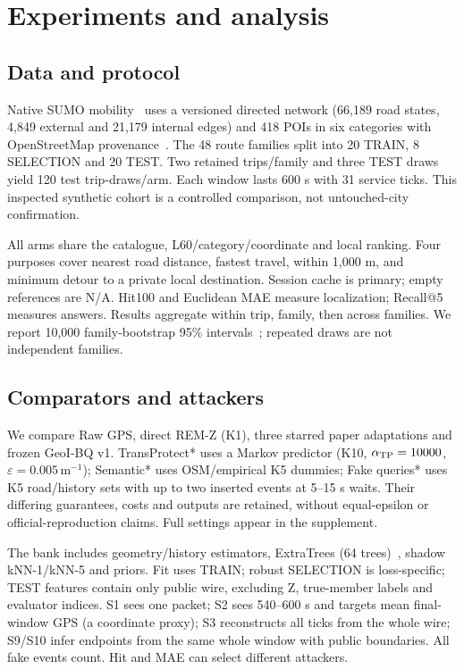 \section{Experiments and analysis}\label{sec:evaluation}
\subsection{Data and protocol}
Native SUMO mobility~\cite{sumo} uses a versioned directed network
(66,189 road states, 4,849 external and 21,179 internal edges) and
418 POIs in six categories with OpenStreetMap provenance~\cite{osm}.
The 48 route families split into 20 TRAIN, 8 SELECTION and 20 TEST.
Two retained trips/family and three TEST draws yield 120 test trip-draws/arm.
Each window lasts 600 s with 31 service ticks. This inspected synthetic cohort
is a controlled comparison, not untouched-city confirmation.

All arms share the catalogue, L60/category/coordinate and local ranking.
Four purposes cover nearest road distance, fastest travel, within 1,000 m,
and minimum detour to a private local destination.
Session cache is primary; empty references are N/A.
Hit100 and Euclidean MAE measure localization; Recall@5 measures answers.
Results aggregate within trip, family, then across families.
We report 10,000 family-bootstrap 95\% intervals~\cite{efron};
repeated draws are not independent families.

\subsection{Comparators and attackers}
We compare Raw GPS, direct REM-Z (K1), three starred paper adaptations and
frozen GeoI-BQ v1. TransProtect* uses a Markov predictor (K10,
$\alpha_{\rm TP}=10000$, $\varepsilon=0.005\,\mathrm m^{-1}$);
Semantic* uses OSM/empirical K5 dummies; Fake queries* uses K5
road/history sets with up to two inserted events at 5--15 s waits.
Their differing guarantees, costs and outputs are retained, without equal-epsilon
or official-reproduction claims. Full settings appear in the supplement.

The bank includes geometry/history estimators, ExtraTrees
(64 trees)~\cite{extratrees}, shadow kNN-1/kNN-5 and priors.
Fit uses TRAIN; robust SELECTION is loss-specific; TEST features contain
only public wire, excluding Z, true-member labels and evaluator indices.
S1 sees one packet; S2 sees 540--600 s and targets mean final-window GPS
(a coordinate proxy); S3 reconstructs all ticks from the whole wire;
S9/S10 infer endpoints from the same whole window with public boundaries.
All fake events count. Hit and MAE can select different attackers.

